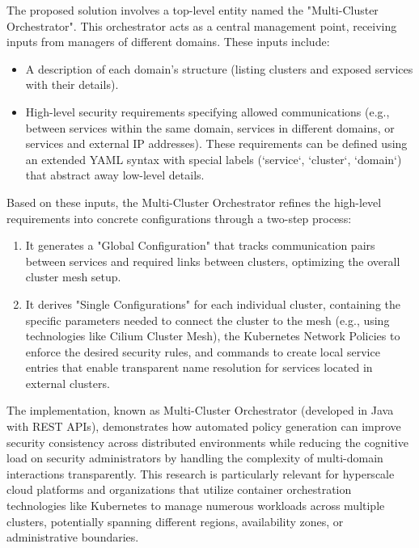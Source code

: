 The proposed solution involves a top-level entity named the "Multi-Cluster Orchestrator"\cite{bringhenti_security_2023}. This orchestrator acts as a central management point, receiving inputs from managers of different domains\cite{bringhenti_security_2023}. These inputs include:
\begin{itemize}
    \item A description of each domain's structure (listing clusters and exposed services with their details)\cite{bringhenti_security_2023}.
    \item High-level security requirements specifying allowed communications (e.g., between services within the same domain, services in different domains, or services and external IP addresses)\cite{bringhenti_security_2023}. These requirements can be defined using an extended YAML syntax with special labels (`service`, `cluster`, `domain`) that abstract away low-level details\cite{bringhenti_security_2023}.
\end{itemize}

Based on these inputs, the Multi-Cluster Orchestrator refines the high-level requirements into concrete configurations through a two-step process\cite{bringhenti_security_2023}:
\begin{enumerate}
    \item It generates a "Global Configuration" that tracks communication pairs between services and required links between clusters, optimizing the overall cluster mesh setup\cite{bringhenti_security_2023}.
    \item It derives "Single Configurations" for each individual cluster, containing the specific parameters needed to connect the cluster to the mesh (e.g., using technologies like Cilium Cluster Mesh), the Kubernetes Network Policies to enforce the desired security rules, and commands to create local service entries that enable transparent name resolution for services located in external clusters\cite{bringhenti_security_2023}.
\end{enumerate}

The implementation, known as Multi-Cluster Orchestrator (developed in Java with REST APIs), demonstrates how automated policy generation can improve security consistency across distributed environments while reducing the cognitive load on security administrators by handling the complexity of multi-domain interactions transparently\cite{bringhenti_security_2023}. This research is particularly relevant for hyperscale cloud platforms and organizations that utilize container orchestration technologies like Kubernetes to manage numerous workloads across multiple clusters, potentially spanning different regions, availability zones, or administrative boundaries\cite{bringhenti_security_2023}.

